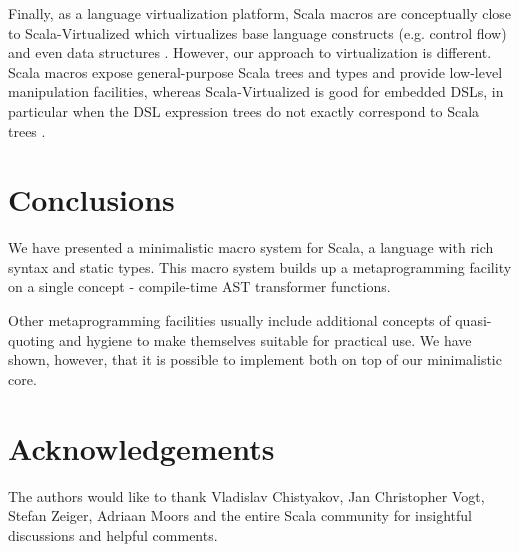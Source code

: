 \documentclass{llncs}
\begin{document}
Finally, as a language virtualization platform, Scala macros are conceptually close to Scala-Virtualized \cite{moors12} which virtualizes base language constructs (e.g. control flow) and even data structures \cite{slesarenko12}. However, our approach to virtualization is different. Scala macros expose general-purpose Scala trees and types and provide low-level manipulation facilities, whereas Scala-Virtualized is good for embedded DSLs, in particular when the DSL expression trees do not exactly correspond to Scala trees \cite{rompf10}.

\section{Conclusions}

We have presented a minimalistic macro system for Scala, a language with rich syntax and static types. This macro system builds up a metaprogramming facility on a single concept - compile-time AST transformer functions.

Other metaprogramming facilities usually include additional concepts of quasi-quoting and hygiene to make themselves suitable for practical use. We have shown, however, that it is possible to implement both on top of our minimalistic core.

\section*{Acknowledgements}

The authors would like to thank Vladislav Chistyakov, Jan Christopher Vogt, Stefan Zeiger, Adriaan Moors and the entire Scala community for insightful discussions and helpful comments.
\end{document}
